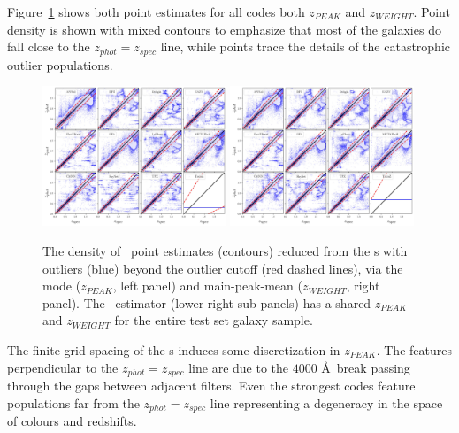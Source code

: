 Figure~\ref{fig:pz_pointestimates} shows both point estimates for all codes  both $z_{PEAK}$ and $z_{WEIGHT}$.
Point density is shown with mixed contours to emphasize that most of the galaxies do fall close to the $z_{phot} = z_{spec}$ line, while points trace the details of the catastrophic outlier populations.

\begin{figure}
\centering
\includegraphics[width=0.49\textwidth]{fig/ZPEAK_szpz_threecolumn_12codes_navy_lowalpha.jpg}
\includegraphics[width=0.49\textwidth]{fig/ZWEIGHT_szpz_threecolumn_12codes_navy_lowalpha.jpg}
\caption{The density of \pz\ point estimates (contours) reduced from the \pzpdf s with outliers (blue) beyond the outlier cutoff (red dashed lines), via the mode ($z_{PEAK}$, left panel) and main-peak-mean ($z_{WEIGHT}$, right panel).
The \trainz\ estimator (lower right sub-panels) has a shared $z_{PEAK}$ and $z_{WEIGHT}$ for the entire test set galaxy sample.}
\label{fig:pz_pointestimates}
\end{figure}

The finite grid spacing of the \pzpdf s induces some discretization in $z_{PEAK}$.
The features perpendicular to the $z_{phot} = z_{spec}$ line are due to the $4000$ \AA\ break passing through the gaps between adjacent filters.
Even the strongest codes feature populations far from the $z_{phot} = z_{spec}$ line representing a degeneracy in the space of colours and redshifts.


